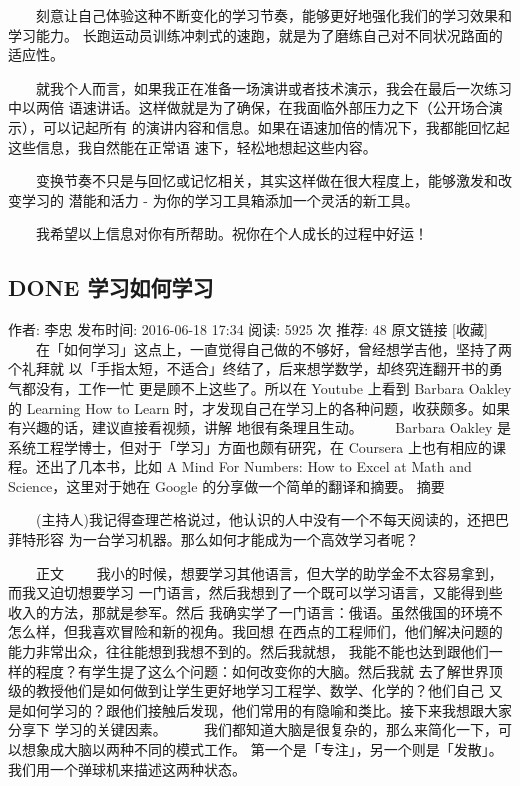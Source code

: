 \documentclass[11pt]{ctexart}
\begin{document}
{{{{　　刻意让自己体验这种不断变化的学习节奏，能够更好地强化我们的学习效果和学习能力。
长跑运动员训练冲刺式的速跑，就是为了磨练自己对不同状况路面的适应性。

　　就我个人而言，如果我正在准备一场演讲或者技术演示，我会在最后一次练习中以两倍
语速讲话。这样做就是为了确保，在我面临外部压力之下（公开场合演示），可以记起所有
的演讲内容和信息。如果在语速加倍的情况下，我都能回忆起这些信息，我自然能在正常语
速下，轻松地想起这些内容。


　　变换节奏不只是与回忆或记忆相关，其实这样做在很大程度上，能够激发和改变学习的
潜能和活力 - 为你的学习工具箱添加一个灵活的新工具。

　　我希望以上信息对你有所帮助。祝你在个人成长的过程中好运！

\subsection{{\bfseries\sffamily DONE} 学习如何学习}
\label{sec:org0325d65}
作者: 李忠  发布时间: 2016-06-18 17:34  阅读: 5925 次  推荐: 48   原文链接   [收藏]
　　在「如何学习」这点上，一直觉得自己做的不够好，曾经想学吉他，坚持了两个礼拜就
以「手指太短，不适合」终结了，后来想学数学，却终究连翻开书的勇气都没有，工作一忙
更是顾不上这些了。所以在 Youtube 上看到 Barbara Oakley 的 Learning How to Learn
时，才发现自己在学习上的各种问题，收获颇多。如果有兴趣的话，建议直接看视频，讲解
地很有条理且生动。
　　Barbara Oakley 是系统工程学博士，但对于「学习」方面也颇有研究，在 Coursera
上也有相应的课程。还出了几本书，比如 A Mind For Numbers: How to Excel at Math
and Science，这里对于她在 Google 的分享做一个简单的翻译和摘要。
摘要

　　(主持人)我记得查理芒格说过，他认识的人中没有一个不每天阅读的，还把巴菲特形容
为一台学习机器。那么如何才能成为一个高效学习者呢？

　　正文
　　我小的时候，想要学习其他语言，但大学的助学金不太容易拿到，而我又迫切想要学习
一门语言，然后我想到了一个既可以学习语言，又能得到些收入的方法，那就是参军。然后
我确实学了一门语言：俄语。虽然俄国的环境不怎么样，但我喜欢冒险和新的视角。我回想
在西点的工程师们，他们解决问题的能力非常出众，往往能想到我想不到的。然后我就想，
我能不能也达到跟他们一样的程度？有学生提了这么个问题：如何改变你的大脑。然后我就
去了解世界顶级的教授他们是如何做到让学生更好地学习工程学、数学、化学的？他们自己
又是如何学习的？跟他们接触后发现，他们常用的有隐喻和类比。接下来我想跟大家分享下
学习的关键因素。
　　
我们都知道大脑是很复杂的，那么来简化一下，可以想象成大脑以两种不同的模式工作。
第一个是「专注」，另一个则是「发散」。我们用一个弹球机来描述这两种状态。

}}}}
\end{document}
